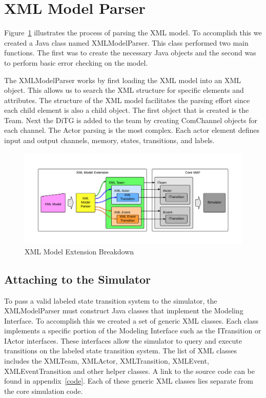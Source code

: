 \begin{spacing}{.5}

\end{spacing}

\section{XML Model Parser}

Figure~\ref{fig:xml_model_extension} illustrates the process of parsing the XML model.  To accomplish this we created a Java class named XMLModelParser.  This class performed two main functions.  The first was to create the necessary Java objects and the second was to perform basic error checking on the model.  

The XMLModelParser works by first loading the XML model into an XML object.  This allows us to search the XML structure for specific elements and attributes.  The structure of the XML model facilitates the parsing effort since each child element is also a child object.  The first object that is created is the Team.  Next the DiTG is added to the team by creating ComChannel objects for each channel.  The Actor parsing is the most complex.  Each actor element defines input and output channels, memory, states, transitions, and labels.

\begin{figure}[h]
\begin{center}
\includegraphics[width=\textwidth]{xml_model_extension.png}
\caption{XML Model Extension Breakdown}
\label{fig:xml_model_extension}
\end{center}
\end{figure}

\subsection{Attaching to the Simulator}

To pass a valid labeled state transition system to the simulator, the XMLModelParser must construct Java classes that implement the Modeling Interface.  To accomplish this we created a set of generic XML classes.  Each class implements a specific portion of the Modeling Interface such as the ITransition or IActor interfaces.  These interfaces allow the simulator to query and execute transitions on the labeled state transition system.  The list of XML classes includes the XMLTeam, XMLActor, XMLTransition, XMLEvent, XMLEventTransition and other helper classes.  A link to the source code can be found in appendix~\ref{code}.  Each of these generic XML classes lies separate from the core simulation code.  

